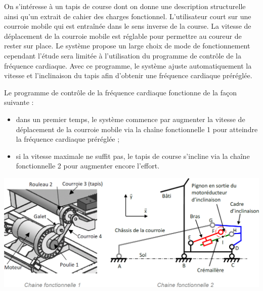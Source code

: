 \documentclass[10pt,fleqn]{article} %
\begin{document}
\def\pathfig{images}

\vspace{4.5cm}
\pagestyle{fancy}
\thispagestyle{plain}

\def\columnseprulecolor{\color{ocre}}
\setlength{\columnseprule}{0.4pt} 

\def\pathfig{images}

\ifprof
\else
\begin{multicols}{2}
\fi
On s’intéresse à un tapis de course dont on
donne une description structurelle ainsi qu’un
extrait de cahier des charges fonctionnel.
L’utilisateur court sur une courroie mobile qui
est entraînée dans le sens inverse de la course.
La vitesse de déplacement de la courroie mobile
est réglable pour permettre au coureur de rester
sur place.
Le système propose un large choix de mode de
fonctionnement cependant l’étude sera limitée
à l’utilisation du programme de contrôle de la
fréquence cardiaque.
Avec ce programme, le système ajuste
automatiquement la vitesse et l’inclinaison du
tapis afin d’obtenir une fréquence cardiaque
préréglée.

Le programme de contrôle de la fréquence cardiaque fonctionne de la façon suivante :
\begin{itemize}
\item dans un premier temps, le système commence par augmenter la vitesse de déplacement de la courroie
mobile via la chaîne fonctionnelle 1 pour atteindre la fréquence cardiaque préréglée ;
\item si la vitesse maximale ne suffit pas, le tapis de course s’incline via la chaîne fonctionnelle 2 pour
augmenter encore l’effort.
\end{itemize}

\begin{center}
\includegraphics[width=\linewidth]{images/fig_01.png}
\end{center}


\end{multicols}
\end{document}
